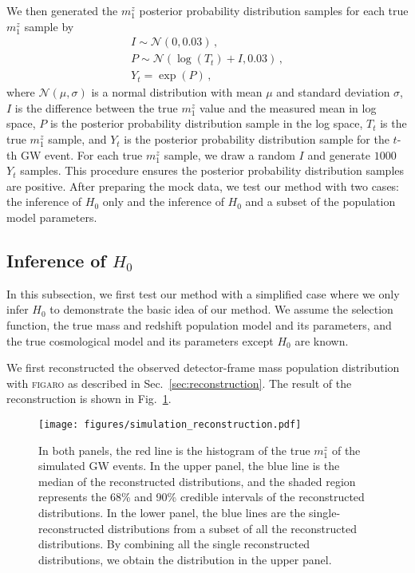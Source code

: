\documentclass[sn-aps, pdflatex]{sn-jnl}
\begin{document}
We then generated the $m^z_1$ posterior probability distribution samples for each true $m^z_1$ sample by
\begin{gather*}
    I \sim \mathcal{N}(0, 0.03)\,,\\
    P \sim \mathcal{N}(\log(T_t)+I, 0.03)\,,\\
    Y_t = \exp(P)\,,
\end{gather*}
where $\mathcal{N}(\mu, \sigma)$ is a normal distribution with mean $\mu$ and standard deviation $\sigma$, $I$ is the difference between the true $m^z_1$ value and the measured mean in log space, $P$ is the posterior probability distribution sample in the log space, $T_t$ is the true $m^z_1$ sample, and $Y_t$ is the posterior probability distribution sample for the $t$-th \ac{GW} event.
For each true $m^z_1$ sample, we draw a random $I$ and generate $1000$ $Y_t$ samples.
This procedure ensures the posterior probability distribution samples are positive.
After preparing the mock data, we test our method with two cases: the inference of $H_0$ only and the inference of $H_0$ and a subset of the population model parameters.

\subsection{Inference of $H_0$}
\label{sec:inference_H0}

In this subsection, we first test our method with a simplified case where we only infer $H_0$ to demonstrate the basic idea of our method.
We assume the selection function, the true mass and redshift population model and its parameters, and the true cosmological model and its parameters except $H_0$ are known.

We first reconstructed the observed detector-frame mass population distribution with \textsc{figaro} as described in Sec.~\ref{sec:reconstruction}.
The result of the reconstruction is shown in Fig.~\ref{fig:simulation_reconstruction}.
\begin{figure}[htbp]
    \texttt{[image: figures/simulation\_reconstruction.pdf]}
    \caption{
        In both panels, the red line is the histogram of the true $m^z_1$ of the simulated \ac{GW} events.
        In the upper panel, the blue line is the median of the reconstructed distributions, and the shaded region represents the 68\% and 90\% credible intervals of the reconstructed distributions.
        In the lower panel, the blue lines are the single-reconstructed distributions from a subset of all the reconstructed distributions.
        By combining all the single reconstructed distributions, we obtain the distribution in the upper panel.
    }
    \label{fig:simulation_reconstruction}
\end{figure}
\end{document}
